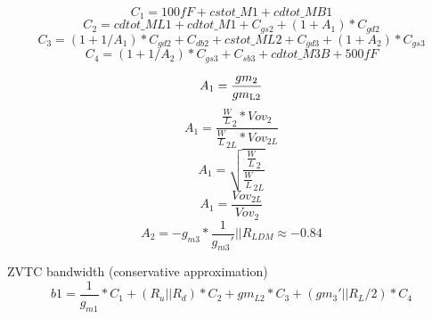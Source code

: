\documentclass[fleqn]{article}
\begin{document}
\begin{flushleft}
\begin{equation}
C_1 = 100fF + cstot\_M1 + cdtot\_MB1
\end{equation}
\begin{equation}
C_2 = cdtot\_ML1 + cdtot\_M1 +  C_{gs2} + (1 + A_1)*C_{gd2} 
\end{equation}
\begin{equation}
C_3 = (1 + 1/A_1)*C_{gd2} + C_{db2} + cstot\_ML2 + C_{gd3} + (1 + A_2)*C_{gs3}
\end{equation}
\begin{equation}
C_4 = (1 + 1/A_2)*C_{gs3} + C_{sb3} + cdtot\_M3B + 500fF
\end{equation}

\begin{equation}
A_1 = \frac{ gm_{2} }{ gm\textsubscript{L2} }
\end{equation}
\begin{equation}
A_1 = \frac{ \frac{W}{L}_2*Vov_2 }{ \frac{W}{L}_{2L}*Vov_{2L} }
\end{equation}
\begin{equation}
A_1 = \sqrt{ \frac{ \frac{W}{L}_2 }{ \frac{W}{L}_{2L} } }
\end{equation}
\begin{equation}
A_1 = \frac{ Vov_{2L} }{ Vov_{2} }
\end{equation}
\begin{equation}
A_2 = -g_{m3}*\frac{1}{g_{m3}'}||R_{LDM} \approx -0.84
\end{equation}


ZVTC bandwidth (conservative approximation)
\begin{equation}
b1 = \frac{1}{g_{m1}}*C_1 + (R_u || R_d)*C_2 + gm_{L2}*C_3 + (gm_3'||R_L/2)*C_4
\end{equation}


\end{flushleft}
\end{document}
